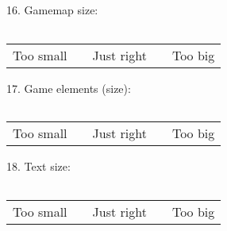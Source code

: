 16. Gamemap size:
\begin{center}
 	\begin{tabular}{| p{1cm} | p{1cm} | p{1cm} | p{1cm} | p{1cm} |}
    	\hline
     	&  &  &  &  \\ \hline
  	\end{tabular}
\end{center}
\begin{center}
	\begin{tabular}{ >{\centering\arraybackslash}p{1cm}  >{\centering\arraybackslash}p{1cm}  >{\centering\arraybackslash}p{1cm}  >{\centering\arraybackslash}p{1cm}  >{\centering\arraybackslash}p{1cm} }
    Too small &  & Just right &  & Too big \\ 
 	\end{tabular}
\end{center}

17. Game elements (size):
\begin{center}
 	\begin{tabular}{| p{1cm} | p{1cm} | p{1cm} | p{1cm} | p{1cm} |}
    	\hline
     	&  &  &  &  \\ \hline
  	\end{tabular}
\end{center}
\begin{center}
	\begin{tabular}{ >{\centering\arraybackslash}p{1cm}  >{\centering\arraybackslash}p{1cm}  >{\centering\arraybackslash}p{1cm}  >{\centering\arraybackslash}p{1cm}  >{\centering\arraybackslash}p{1cm} }
    Too small &  & Just right &  & Too big \\ 
 	\end{tabular}
\end{center}

18. Text size:
\begin{center}
 	\begin{tabular}{| p{1cm} | p{1cm} | p{1cm} | p{1cm} | p{1cm} |}
    	\hline
     	&  &  &  &  \\ \hline
  	\end{tabular}
\end{center}
\begin{center}
	\begin{tabular}{ >{\centering\arraybackslash}p{1cm}  >{\centering\arraybackslash}p{1cm}  >{\centering\arraybackslash}p{1cm}  >{\centering\arraybackslash}p{1cm}  >{\centering\arraybackslash}p{1cm} }
    Too small &  & Just right &  & Too big \\ 
 	\end{tabular}
\end{center}

